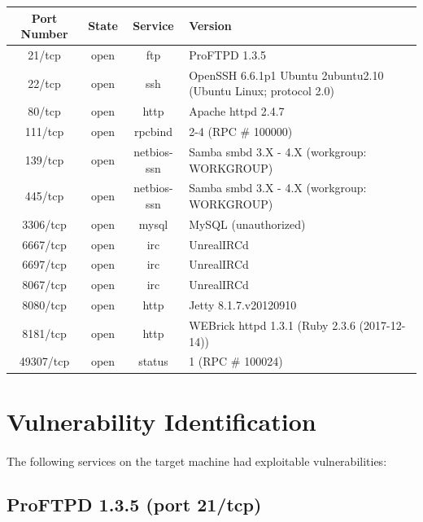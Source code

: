 \documentclass{article}
\begin{document}
\begin{adjustwidth}{-2cm}{}
\begin{tabular}{ |c|c|c|l| }
\hline
Port Number & State & Service & Version \\
\hline
21/tcp & open & ftp & ProFTPD 1.3.5 \\
\hline
22/tcp & open & ssh & OpenSSH 6.6.1p1 Ubuntu 2ubuntu2.10 (Ubuntu Linux; protocol 2.0) \\
\hline
80/tcp & open & http & Apache httpd 2.4.7 \\
\hline
111/tcp & open & rpcbind & 2-4 (RPC \# 100000) \\
\hline
139/tcp & open & netbios-ssn & Samba smbd 3.X - 4.X (workgroup: WORKGROUP) \\
\hline
445/tcp & open & netbios-ssn & Samba smbd 3.X - 4.X (workgroup: WORKGROUP) \\
\hline
3306/tcp & open & mysql & MySQL (unauthorized) \\
\hline
6667/tcp & open & irc & UnrealIRCd \\
\hline
6697/tcp & open & irc & UnrealIRCd \\
\hline
8067/tcp & open & irc & UnrealIRCd \\
\hline
8080/tcp & open & http & Jetty 8.1.7.v20120910 \\
\hline
8181/tcp & open & http & WEBrick httpd 1.3.1 (Ruby 2.3.6 (2017-12-14)) \\
\hline
49307/tcp & open & status & 1 (RPC \# 100024) \\
\hline
\end{tabular}
\end{adjustwidth}

\newpage

\section{Vulnerability Identification}
\paragraph{}
The following services on the target machine had exploitable vulnerabilities:

\subsection{ProFTPD 1.3.5 (port 21/tcp)}
\end{document}
